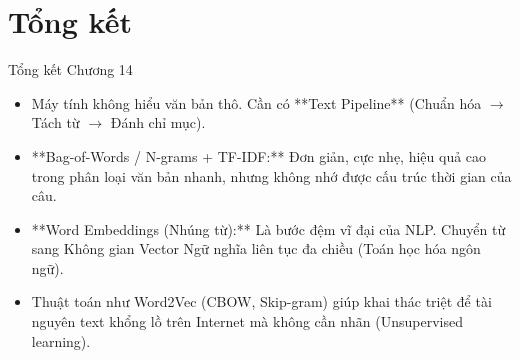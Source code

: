 \documentclass[aspectratio=169]{beamer}
\begin{document}
\section{Tổng kết}

\begin{frame}{Tổng kết Chương 14}
    \begin{itemize}
        \item Máy tính không hiểu văn bản thô. Cần có **Text Pipeline** (Chuẩn hóa $\rightarrow$ Tách từ $\rightarrow$ Đánh chỉ mục).
        \item **Bag-of-Words / N-grams + TF-IDF:** Đơn giản, cực nhẹ, hiệu quả cao trong phân loại văn bản nhanh, nhưng không nhớ được cấu trúc thời gian của câu.
        \item **Word Embeddings (Nhúng từ):** Là bước đệm vĩ đại của NLP. Chuyển từ sang Không gian Vector Ngữ nghĩa liên tục đa chiều (Toán học hóa ngôn ngữ).
        \item Thuật toán như Word2Vec (CBOW, Skip-gram) giúp khai thác triệt để tài nguyên text khổng lồ trên Internet mà không cần nhãn (Unsupervised learning).
    \end{itemize}
\end{frame}
\end{document}
